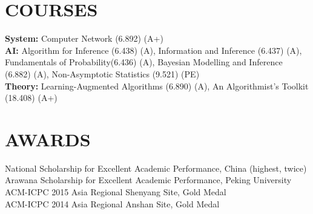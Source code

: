 \documentclass[margin]{res}
\newcommand{\Bullet}[1]{{\raisebox{0.25ex}{\tiny$\bullet$\ }}{#1}\\}
\begin{document}
\begin{resume}

\section{COURSES}
\textbf{System:} Computer Network (6.892) (A+) \\
\textbf{AI:} Algorithm for Inference (6.438) (A), Information and Inference (6.437) (A), Fundamentals of Probability(6.436) (A), Bayesian Modelling and Inference (6.882) (A), Non-Asymptotic Statistics (9.521) (PE) \\
\textbf{Theory:} Learning-Augmented Algorithms (6.890) (A), An Algorithmist's Toolkit (18.408) (A+)\\

\section{AWARDS}
    \Bullet{National Scholarship for Excellent Academic Performance, China (highest, twice)}
    \Bullet{Arawana Scholarship for Excellent Academic Performance, Peking University}
    \Bullet{ACM-ICPC 2015 Asia Regional Shenyang Site, Gold Medal}
    \Bullet{ACM-ICPC 2014 Asia Regional Anshan Site, Gold Medal}


\end{resume}
\end{document}
